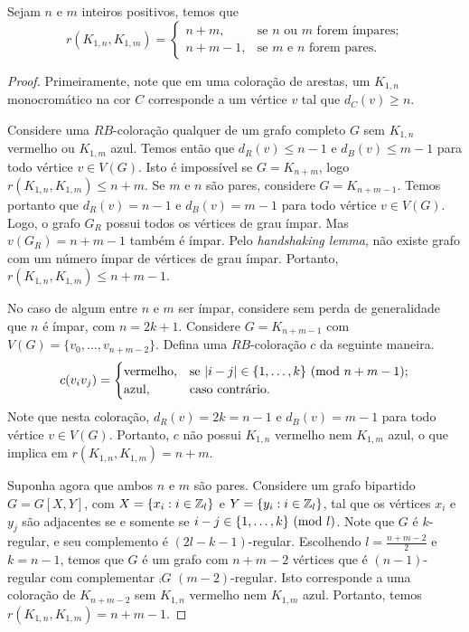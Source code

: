 \begin{theorem}
Sejam $n$ e $m$ inteiros positivos, temos que
\[r(K_{1,n}, K_{1,m}) = \begin{cases}
  n + m , & \text{se } n \text{ ou } m  \text{ forem ímpares;} \\
  n + m - 1, & \text{se } m \text{ e } n \text{ forem pares.}
\end{cases}\]
\end{theorem}
\begin{proof}
Primeiramente, note que em uma coloração de arestas, um $K_{1,n}$ monocromático na cor $C$ corresponde a um vértice $v$ tal que $d_C(v) \geq n$.

Considere uma $RB$-coloração qualquer de um grafo completo $G$ sem $K_{1,n}$ vermelho ou $K_{1,m}$ azul. Temos então que $d_R(v) \leq n-1$ e $d_B(v) \leq m-1$ para todo vértice $v \in V(G)$. Isto é impossível se $G = K_{n+m}$, logo $r(K_{1,n}, K_{1,m}) \leq n+m$.
Se $m$ e $n$ são pares, considere $G = K_{n+m-1}$. Temos portanto que $d_R(v) = n-1$ e $d_B(v) = m-1$ para todo vértice $v \in V(G)$. Logo, o grafo $G_R$ possui todos os vértices de grau ímpar. Mas $v(G_R) = n + m -1$ também é ímpar. Pelo \emph{handshaking lemma}, não existe grafo com um número ímpar de vértices de grau ímpar. Portanto, $r(K_{1,n}, K_{1,m}) \leq n + m - 1$.

No caso de algum entre $n$ e $m$ ser ímpar, considere sem perda de generalidade que $n$ é ímpar, com $n = 2k + 1$. Considere $G  = K_{n+m-1}$ com $V(G) = \{ v_0, \dots, v_{n+m-2} \}$. Defina uma $RB$-coloração $c$ da seguinte maneira.
\[c(v_i v_j) = \begin{cases}
  \text{vermelho}, & \text{se }  |i - j| \in \{ 1, \dots, k\} \ (\text{mod}\ n+m-1); \\
  \text{azul}, & \text{caso contrário}.
\end{cases}\]
Note que nesta coloração, $d_R(v) = 2k = n - 1$ e $d_B(v) = m - 1$ para todo vértice $v \in V(G)$. Portanto, $c$ não possui $K_{1,n}$ vermelho nem $K_{1,m}$ azul, o que implica em $r(K_{1,n}, K_{1,m}) = n + m$.

Suponha agora que ambos $n$ e $m$ são pares. Considere um grafo bipartido $G = G[X,Y]$, com $X = \{ x_i : i \in \mathbb{Z}_{l} \}$ e $Y = \{ y_i : i \in \mathbb{Z}_{l} \}$, tal que os vértices $x_i$ e $y_j$ são adjacentes se e somente se $i - j \in \{ 1, \dots, k\} \ (\text{mod}\ l)$. Note que $G$ é $k$-regular, e seu complemento é $(2l - k - 1)$-regular.
Escolhendo $l = \frac{n + m -2}{2}$ e $k = n-1$, temos que $G$ é um grafo com $n + m - 2$ vértices que é $(n-1)$-regular com complementar $\comp{G}$ $(m-2)$-regular. Isto corresponde a uma coloração de $K_{n + m - 2}$ sem $K_{1,n}$ vermelho nem $K_{1,m}$ azul. Portanto, temos $r(K_{1,n}, K_{1,m}) = n + m - 1$.
\end{proof}

